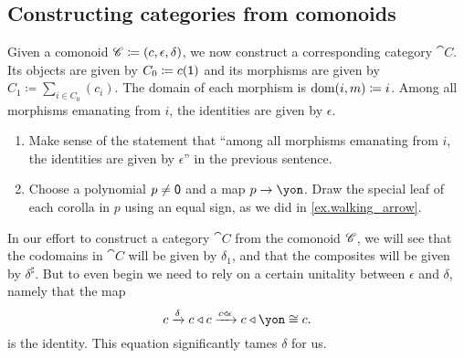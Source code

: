 \documentclass[DynamicalBook]{subfiles}
\begin{document}
\subsection{Constructing categories from comonoids}

Given a comonoid $\mathscr{C}\coloneqq(c,\epsilon,\delta)$, we now construct a corresponding category $\cat{C}$. Its objects are given by $C_0\coloneqq c(\textsf{1})$ and its morphisms are given by $C_1\coloneqq\sum_{i\in C_0}(c_i)$. The domain of each morphism is $\operatorname{dom}(i,m)\coloneqq i$. Among all morphisms emanating from $i$, the identities are given by $\epsilon$.

\begin{exercise}
\begin{enumerate}
	\item Make sense of the statement that ``among all morphisms emanating from $i$, the identities are given by $\epsilon$'' in the previous sentence. 
	\item Choose a polynomial $p\neq \textsf{0}$ and a map $p\to\yon$. Draw the special leaf of each corolla in $p$ using an equal sign, as we did in \cref{ex.walking_arrow}.
\qedhere
\end{enumerate}
\end{exercise}

In our effort to construct a category $\cat{C}$ from the comonoid $\mathscr{C}$, we will see that the codomains in $\cat{C}$ will be given by $\delta_1$, and that the composites will be given by $\delta^\sharp$. But to even begin we need to rely on a certain unitality between $\epsilon$ and $\delta$, namely that the map
\begin{equation}\label{eqn.unital_misc28}
c\To{\delta}c\tri c\To{c\tri\epsilon}c\tri\yon\cong c.
\end{equation}
is the identity. This equation significantly tames $\delta$ for us. 
\end{document}
